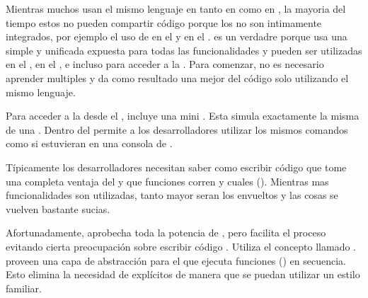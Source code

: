 Mientras muchos \frameworks usan el mismo lenguaje en tanto en \client como en \server, la mayoria del tiempo estos no pueden compartir código porque los \frameworks no son intimamente integrados, por ejemplo el uso de \angularjs en el \frontend y \expressjs en el \backend. \meteor es un \fullstack verdadre porque usa una simple y unificada \api expuesta para todas las funcionalidades \core y pueden ser utilizadas en el \server, en el \browser, e incluso para acceder a la \database. Para comenzar, no es necesario aprender multiples \frameworks y da como resultado una mejor \reusability del código solo utilizando el mismo lenguaje.

Para acceder a la \database desde el \browser, \meteor incluye una mini \database. Esta simula exactamente la misma \api de una \database. Dentro del \browser \minimongo permite a los desarrolladores utilizar los mismos comandos como si estuvieran en una consola de \mongodb.

Típicamente los desarrolladores necesitan saber como escribir código que tome una completa ventaja del \eventloop y que funciones corren \synchronously y cuales \asynchronously (). Mientras mas funcionalidades \asynchronously son utilizadas, tanto mayor seran los \callbacks envueltos y las cosas se vuelven bastante sucias.

Afortunadamente, \meteor aprobecha toda la potencia de \eventloop, pero facilita el proceso evitando cierta preocupación sobre escribir código \asynchronous. Utiliza el concepto llamado \fibers \behindthescenes. \fibers proveen una capa de abstracción para el \eventloop que ejecuta funciones \asynchronous(\tasks) en secuencia. Esto elimina la necesidad de \callbacks explícitos de manera que se puedan utilizar un estilo \synchronous familiar.


